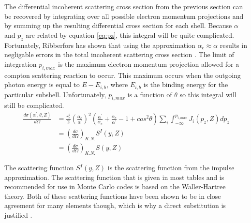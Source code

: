 The differential incoherent scattering cross section from the previous section
can be recovered by integrating over all possible electron momentum projections
and by summing up the resulting differential cross section for each shell.
Because $\alpha$ and $p_z$ are related by equation \ref{eq:pz}, this integral
will be quite complicated. Fortunately, Ribberfors has shown that using the
approximation $\alpha_c \approx \alpha$ results in negligable errors in the 
total incoherent scattering cross section \citep{ribberfors_x-ray_1983}. The
limit of integration $p_{i,max}$ is the maximum electron momentum projection
allowed for a compton scattering reaction to occur. This maximum occurs when
the outgoing photon energy is equal to $E - E_{i,b}$, where $E_{i,b}$ is the 
binding energy for the particular subshell. Unfortunately, $p_{i,max}$ is a 
function of $\theta$ so this integral will still be complicated. 
\begin{align}
  \frac{d\sigma(\alpha^{'},\theta,Z)}{d\Omega} & = 
  \frac{r_e^2}{2} \left(\frac{\alpha_c}{\alpha^{'}}\right)^2 
  \left(\frac{\alpha^{'}}{\alpha_c} + \frac{\alpha_c}{\alpha^{'}} - 1 + 
  cos^2\theta \right) \sum_i \int_{-\infty}^{p_{i,max}} J_i(p_z,Z)dp_z \nonumber \\
  & = \left(\frac{d\sigma}{d\Omega}\right)_{K.N.} S^I(y,Z) \nonumber \\
  & = \left(\frac{d\sigma}{d\Omega}\right)_{K.N.} S(y,Z) \nonumber
\end{align}

The scattering function $S^I(y,Z)$ is the scattering function from the
impulse approximation. The scattering function that is given in most tables
and is recommended for use in Monte Carlo codes is based on the Waller-Hartree
theory. Both of these scattering functions have been shown to be in close 
agreement for many elements though, which is why a direct substitution is 
justified \citep{namito_implementation_1994}. 

